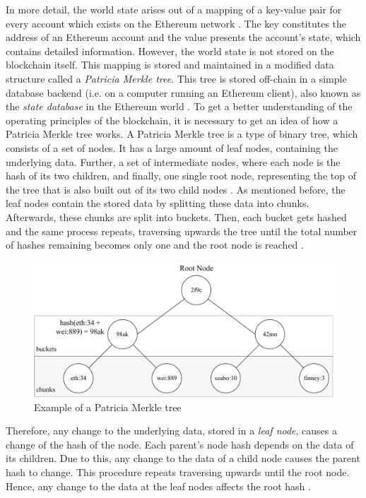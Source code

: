 In more detail, the world state arises out of a mapping of a key-value pair for every account which exists 
on the Ethereum network . 
The key constitutes the address of an Ethereum account and the value presents 
the account's state, which contains detailed information. 
However, the world state is not stored on the blockchain itself. 
This mapping is stored and maintained in a modified data structure 
called a \textit{Patricia Merkle tree}. This tree is stored off-chain 
in a simple database backend (i.e. on a computer running an Ethereum client), 
also known as the \textit{state database} in the Ethereum world . 
To get a better understanding of the operating principles of the blockchain, 
it is necessary to get an idea of how a Patricia Merkle tree works. 
A Patricia Merkle tree is a type of binary tree, which consists 
of a set of nodes. It has a large amount of 
leaf nodes, containing the underlying data. 
Further, a set of intermediate nodes, where each node is 
the hash of its two children, and finally, one single root node, 
representing the top of the tree that is also built out of its 
two child nodes  .
As mentioned before, the leaf nodes contain the stored data 
by splitting these data into chunks. Afterwards, these chunks are split into buckets. 
Then, each bucket gets hashed and the same process repeats, traversing 
upwards the tree until the total number of hashes remaining becomes 
only one and the root node is reached . 

\begin{figure}[htbp]
	\centering
	\includegraphics[width=.8\linewidth]{./figures/merkle_tree.pdf}
	\caption{Example of a Patricia Merkle tree}
	\label{figure:merkle_tree}
\end{figure}

Therefore, any change to the underlying data, stored in a \textit{leaf node}, causes a change
of the hash of the node. Each parent's node hash depends on the data of its children. 
Due to this, any change to the data of a child node causes the parent hash to change. 
This procedure repeats traversing upwards until the root node. 
Hence, any change to the data at the leaf nodes affects the root hash . 


